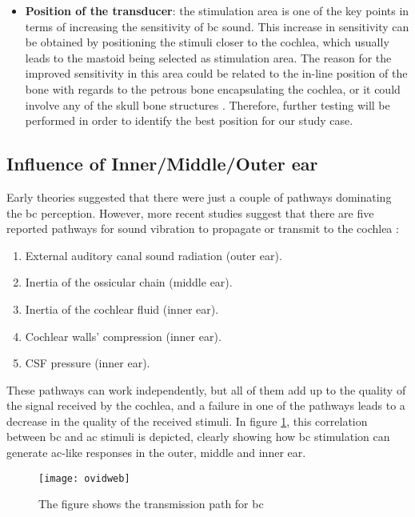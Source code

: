 \begin{itemize}
\item \textbf{Position of the transducer}: the stimulation area is one of the key points in terms of increasing the sensitivity of \gls{bc} sound. This increase in sensitivity can be obtained by positioning the stimuli closer to the cochlea, which usually leads to the mastoid being selected as stimulation area. The reason for the improved sensitivity in this area could be related to the in-line position of the bone with regards to the petrous bone encapsulating the cochlea, or it could involve any of the skull bone structures \citep{puria_2013}. Therefore, further testing will be performed in order to identify the best position for our study case.
\end{itemize}
\subsection{Influence of Inner/Middle/Outer ear}

Early theories suggested that there were just a couple of pathways dominating the \gls{bc} perception. However, more recent studies suggest that there are five reported pathways for sound vibration to propagate or transmit to the cochlea \citep{zhang_2016}:
\begin{enumerate}
\item External auditory canal sound radiation (outer ear).
\item Inertia of the ossicular chain (middle ear).
\item Inertia of the cochlear fluid (inner ear).
\item Cochlear walls' compression (inner ear).
\item CSF pressure (inner ear).
\end{enumerate}

These pathways can work independently, but all of them add up to the quality of the signal received by the cochlea, and a failure in one of the pathways leads to a decrease in the quality of the received stimuli. In figure \ref{fig:hearing_system_pathway}, this correlation between \gls{bc} and \gls{ac} stimuli is depicted, clearly showing how \gls{bc} stimulation can generate \gls{ac}-like responses in the outer, middle and inner ear.

 \begin{figure}[H]
	\centering
		\texttt{[image: ovidweb]}
		\caption{The figure shows the transmission path for \gls{bc} \citep{stenfelt_2005}}
		\label{fig:hearing_system_pathway}
\end{figure}

